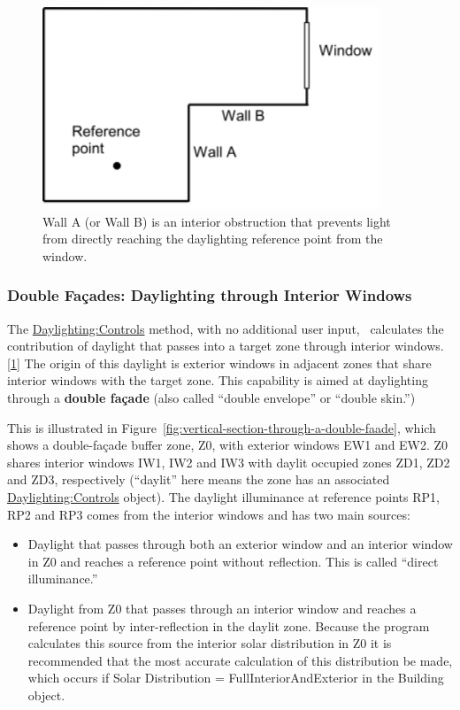 \begin{figure}[hbtp] %
\centering
\includegraphics[width=0.9\textwidth, height=0.9\textheight, keepaspectratio=true]{media/image101.png}
\caption{Wall A (or Wall B) is an interior obstruction that prevents light from directly reaching the daylighting reference point from the window. \protect \label{fig:wall-a-or-wall-b-is-an-interior-obstruction}}
\end{figure}

\subsubsection{Double Façades: Daylighting through Interior Windows}\label{double-fauxe7ades-daylighting-through-interior-windows}

The \hyperref[daylightingcontrols-000]{Daylighting:Controls} method, with no additional user input,~ calculates the contribution of daylight that passes into a target zone through interior windows.\protect\hyperlink{ux5fftn1}{{[}1{]}} The origin of this daylight is exterior windows in adjacent zones that share interior windows with the target zone. This capability is aimed at daylighting through a \textbf{double façade} (also called ``double envelope'' or ``double skin.'')

This is illustrated in Figure~\ref{fig:vertical-section-through-a-double-faade}, which shows a double-façade buffer zone, Z0, with exterior windows EW1 and EW2. Z0 shares interior windows IW1, IW2 and IW3 with daylit occupied zones ZD1, ZD2 and ZD3, respectively (``daylit'' here means the zone has an associated \hyperref[daylightingcontrols-000]{Daylighting:Controls} object). The daylight illuminance at reference points RP1, RP2 and RP3 comes from the interior windows and has two main sources:

\begin{itemize}
  \item
    Daylight that passes through both an exterior window and an interior window in Z0 and reaches a reference point without reflection. This is called ``direct illuminance.''
  \item
    Daylight from Z0 that passes through an interior window and reaches a reference point by inter-reflection in the daylit zone. Because the program calculates this source from the interior solar distribution in Z0 it is recommended that the most accurate calculation of this distribution be made, which occurs if Solar Distribution = FullInteriorAndExterior in the Building object.
\end{itemize}


